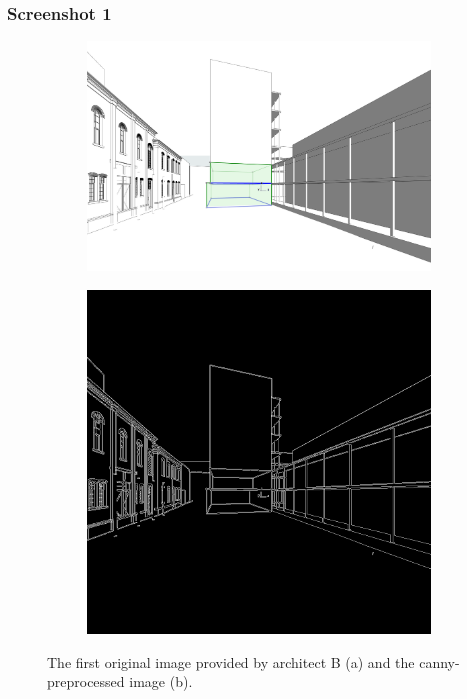 \subsubsection{Screenshot 1}
\begin{figure}[H]
    \centering
    \begin{subfigure}[b]{0.3\textwidth}
        \centering
        \includegraphics[width=\textwidth]{Images/Results/Architect-B_unstructured-phase/screenshots/screenshot_1.png}
        \caption{}
        \label{A-unstructured-1-sketch}
    \end{subfigure}
    \begin{subfigure}[b]{0.3\textwidth}
        \centering 
        \includegraphics[width=\textwidth]{Images/Results/Architect-B_unstructured-phase/screenshots/screenshot_1_preprocessed.png}
        \caption{}
        \label{A-unstructured-1-sketch-prep}
    \end{subfigure}
    \caption{The first original image provided by architect B (a) and the canny-preprocessed image (b).}
    \label{fig:B-screenshot-1}
\end{figure}

